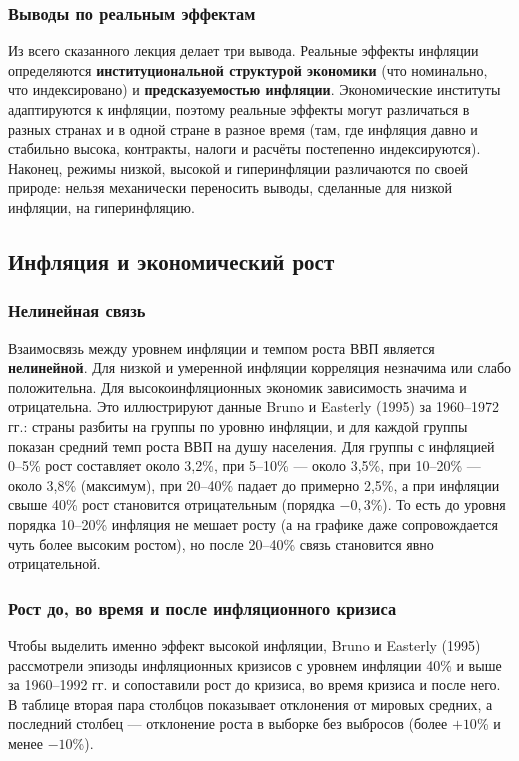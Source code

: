 \documentclass[11pt,a4paper]{article}
\begin{document}
\subsubsection{Выводы по реальным эффектам}

Из всего сказанного лекция делает три вывода. Реальные эффекты инфляции определяются \textbf{институциональной структурой экономики} (что номинально, что индексировано) и \textbf{предсказуемостью инфляции}. Экономические институты адаптируются к инфляции, поэтому реальные эффекты могут различаться в разных странах и в одной стране в разное время (там, где инфляция давно и стабильно высока, контракты, налоги и расчёты постепенно индексируются). Наконец, режимы низкой, высокой и гиперинфляции различаются по своей природе: нельзя механически переносить выводы, сделанные для низкой инфляции, на гиперинфляцию.

\subsection{Инфляция и экономический рост}

\subsubsection{Нелинейная связь}

Взаимосвязь между уровнем инфляции и темпом роста ВВП является \textbf{нелинейной}. Для низкой и умеренной инфляции корреляция незначима или слабо положительна. Для высокоинфляционных экономик зависимость значима и отрицательна. Это иллюстрируют данные Bruno и Easterly (1995) за 1960--1972 гг.: страны разбиты на группы по уровню инфляции, и для каждой группы показан средний темп роста ВВП на душу населения. Для группы с инфляцией 0--5\% рост составляет около 3,2\%, при 5--10\% --- около 3,5\%, при 10--20\% --- около 3,8\% (максимум), при 20--40\% падает до примерно 2,5\%, а при инфляции свыше 40\% рост становится отрицательным (порядка $-0{,}3$\%). То есть до уровня порядка 10--20\% инфляция не мешает росту (а на графике даже сопровождается чуть более высоким ростом), но после 20--40\% связь становится явно отрицательной.

\subsubsection{Рост до, во время и после инфляционного кризиса}

Чтобы выделить именно эффект высокой инфляции, Bruno и Easterly (1995) рассмотрели эпизоды инфляционных кризисов с уровнем инфляции 40\% и выше за 1960--1992 гг. и сопоставили рост до кризиса, во время кризиса и после него. В таблице вторая пара столбцов показывает отклонения от мировых средних, а последний столбец --- отклонение роста в выборке без выбросов (более $+10$\% и менее $-10$\%).
\end{document}
